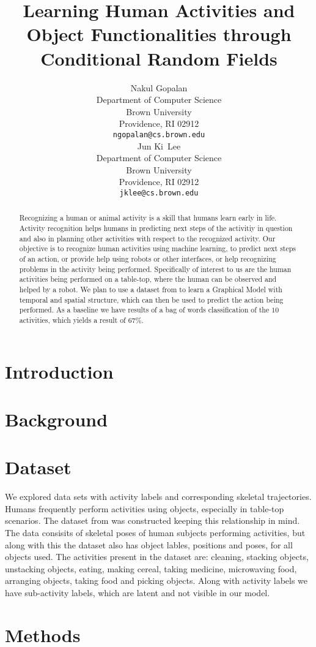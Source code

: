 \documentclass{article} %
\title{Learning Human Activities and Object Functionalities through Conditional Random Fields}
\author{
Nakul Gopalan\\
Department of Computer Science\\
Brown University\\
Providence, RI 02912 \\
\texttt{ngopalan@cs.brown.edu} \\
\And
Jun Ki~Lee\\
Department of Computer Science\\
Brown University\\
Providence, RI 02912 \\
\texttt{jklee@cs.brown.edu} \\
}
\begin{document}
\maketitle

\begin{abstract}
Recognizing a human or animal activity is a skill that humans learn early in life. Activity recognition helps humans in predicting next steps of the activitiy in question and also in planning other activities with respect to the recognized activity. Our objective is to recognize human activities using machine learning, to predict next steps of an action, or provide help using robots or other interfaces, or help recognizing problems in the activity being performed. Specifically of interest to us are the human activities being performed on a table-top, where the human can be observed and helped by a robot. We plan to use a dataset from \cite{koppula2013detectingactivitiesrgbd} to learn a Graphical Model with temporal and spatial structure, which can then be used to predict the action being performed. As a baseline we have results of a bag of words classification of the $10$ activities, which yields a result of $67\%$.
\end{abstract}

\section{Introduction}

\section{Background}

\section{Dataset}
We explored data sets with activity labels and corresponding skeletal trajectories. Humans frequently perform activities using objects, especially in table-top scenarios. The dataset from \cite{koppula2013detectingactivitiesrgbd} was constructed keeping this relationship in mind. The data consisits of skeletal poses of human subjects performing activities, but along with this the dataset also has object lables, positions and poses, for all objects used. The activities present in the dataset are: cleaning, stacking objects, unstacking objects, eating, making cereal, taking medicine, microwaving food, arranging objects, taking food and picking objects. Along with activity labels we have sub-activity labels, which are latent and not visible in our model. 

\section{Methods}



\end{document}
